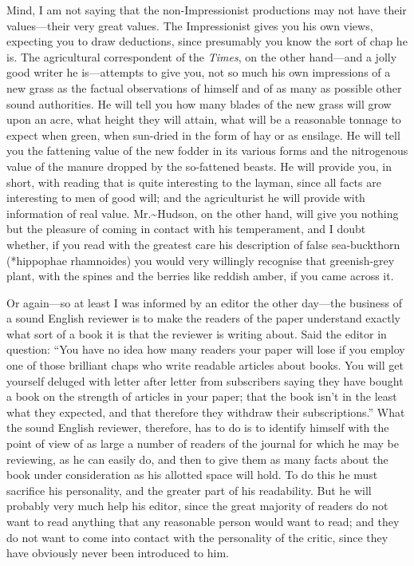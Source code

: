 Mind, I am not saying that the non-Impressionist productions may not
have their values---their very great values. The Impressionist gives you
his own views, expecting you to draw deductions, since presumably you
know the sort of chap he is. The agricultural correspondent of the
\emph{Times}, on the other hand---and a jolly good writer he
is---attempts to give you, not so much his own impressions of a new
grass as the factual observations of himself and of as many as possible
other sound authorities. He will tell you how many blades of the new
grass will grow upon an acre, what height they will attain, what will be
a reasonable tonnage to expect when green, when sun-dried in the form of
hay or as ensilage. He will tell you the fattening value of the new
fodder in its various forms and the nitrogenous value of the manure
dropped by the so-fattened beasts. He will provide you, in short, with
reading that is quite interesting to the layman, since all facts are
interesting to men of good will; and the agriculturist he will provide
with information of real value. Mr.\textasciitilde{}Hudson, on the other
hand, will give you nothing but the pleasure of coming in contact with
his temperament, and I doubt whether, if you read with the greatest care
his description of false sea-buckthorn (*hippophae rhamnoides) you would
very willingly recognise that greenish-grey plant, with the spines and
the berries like reddish amber, if you came across it.

Or again---so at least I was informed by an editor the other day---the
business of a sound English reviewer is to make the readers of the paper
understand exactly what sort of a book it is that the reviewer is
writing about. Said the editor in question: ``You have no idea how many
readers your paper will lose if you employ one of those brilliant chaps
who write readable articles about books. You will get yourself deluged
with letter after letter from subscribers saying they have bought a book
on the strength of articles in your paper; that the book isn't in the
least what they expected, and that therefore they withdraw their
subscriptions.'' What the sound English reviewer, therefore, has to do
is to identify himself with the point of view of as large a number of
readers of the journal for which he may be reviewing, as he can easily
do, and then to give them as many facts about the book under
consideration as his allotted space will hold. To do this he must
sacrifice his personality, and the greater part of his readability. But
he will probably very much help his editor, since the great majority of
readers do not want to read anything that any reasonable person would
want to read; and they do not want to come into contact with the
personality of the critic, since they have obviously never been
introduced to him.


